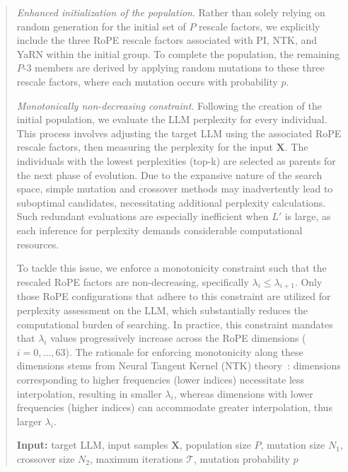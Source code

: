 \begin{abstract}
\textit{Enhanced initialization of the population}. Rather than solely relying on random generation for the initial set of $P$ rescale factors, we explicitly include the three RoPE rescale factors associated with PI, NTK, and YaRN within the initial group. To complete the population, the remaining $P$-3 members are derived by applying random mutations to these three rescale factors, where each mutation occurs with probability $p$.

\textit{Monotonically non-decreasing constraint}. Following the creation of the initial population, we evaluate the LLM perplexity for every individual. This process involves adjusting the target LLM using the associated RoPE rescale factors, then measuring the perplexity for the input $\mathbf{X}$. The individuals with the lowest perplexities (top-k) are selected as parents for the next phase of evolution. Due to the expansive nature of the search space, simple mutation and crossover methods may inadvertently lead to suboptimal candidates, necessitating additional perplexity calculations. Such redundant evaluations are especially inefficient when $L'$ is large, as each inference for perplexity demands considerable computational resources.

To tackle this issue, we enforce a monotonicity constraint such that the rescaled RoPE factors are non-decreasing, specifically $\lambda_i \leq \lambda_{i+1}$. Only those RoPE configurations that adhere to this constraint are utilized for perplexity assessment on the LLM, which substantially reduces the computational burden of searching. In practice, this constraint mandates that $\lambda_i$ values progressively increase across the RoPE dimensions ($i = 0, \ldots, 63$). The rationale for enforcing monotonicity along these dimensions stems from Neural Tangent Kernel (NTK) theory~\cite{jacot2018neural,tancik2020fourier,ntk}: dimensions corresponding to higher frequencies (lower indices) necessitate less interpolation, resulting in smaller $\lambda_i$, whereas dimensions with lower frequencies (higher indices) can accommodate greater interpolation, thus larger $\lambda_i$.

\begin{algorithm}[t]
	\small
	\caption{The search algorithm}
	\textbf{Input:} target LLM, input samples $\mathbf{X}$, population size $P$, mutation size $N_1$, crossover size $N_2$, maximum iterations $\mathcal{T}$, mutation probability $p$\\


\end{algorithm}
\end{abstract}

